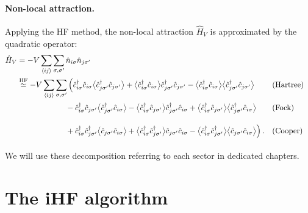 \paragraph{Non-local attraction.} Applying the HF method, the non-local attraction $\hat H_V$ is approximated by the quadratic operator:
\begin{align}
	\hat H_V &= -V \sum_{\ev{ij}} \sum_{\sigma,\sigma'} \hat n_{i\sigma} \hat n_{j\sigma'} \label{eq:mft-HV} \\
	&\HFsimeq -V \sum_{\ev{ij}} \sum_{\sigma,\sigma'} \Big(
	\hat c_{i\sigma}^\dagger \hat c_{i\sigma} \big\langle \hat c_{j\sigma'}^\dagger \hat c_{j\sigma'} \big\rangle + \big\langle \hat c_{i\sigma}^\dagger \hat c_{i\sigma} \big\rangle \hat c_{j\sigma'}^\dagger \hat c_{j\sigma'} - \big\langle \hat c_{i\sigma}^\dagger \hat c_{i\sigma} \big\rangle  \big\langle \hat c_{j\sigma'}^\dagger \hat c_{j\sigma'} \big\rangle &&(\text{Hartree}) \nonumber\\
	&\phantom{\simeq \sum_{{i\sigma}\neq{j\sigma'}} V_{{i\sigma}{j\sigma'}}}
	- \hat c_{i\sigma}^\dagger \hat c_{j\sigma'} \big\langle \hat c_{j\sigma'}^\dagger \hat c_{i\sigma} \big\rangle - \big\langle \hat c_{i\sigma}^\dagger \hat c_{j\sigma'} \big\rangle \hat c_{j\sigma'}^\dagger \hat c_{i\sigma} + \big\langle \hat c_{i\sigma}^\dagger \hat c_{j\sigma'} \big\rangle  \big\langle \hat c_{j\sigma'}^\dagger \hat c_{i\sigma} \big\rangle &&(\text{Fock}) \nonumber\\
	&\phantom{\simeq \sum_{{i\sigma}\neq{j\sigma'}} V_{{i\sigma}{j\sigma'}}}
	+ \hat c_{i\sigma}^\dagger \hat c_{j\sigma'}^\dagger \big\langle \hat c_{j\sigma'} \hat c_{i\sigma} \big\rangle + \big\langle \hat c_{i\sigma}^\dagger \hat c_{j\sigma'}^\dagger \big\rangle \hat c_{j\sigma'} \hat c_{i\sigma} - \big\langle \hat c_{i\sigma}^\dagger \hat c_{j\sigma'}^\dagger \big\rangle  \big\langle \hat c_{j\sigma'} \hat c_{i\sigma} \big\rangle
	\Big) \, . &&(\text{Cooper}) \nonumber
\end{align}
We will use these decomposition referring to each sector in dedicated chapters.

\section{The iHF algorithm}\label{sec:sketch-ihf-algorithm}

